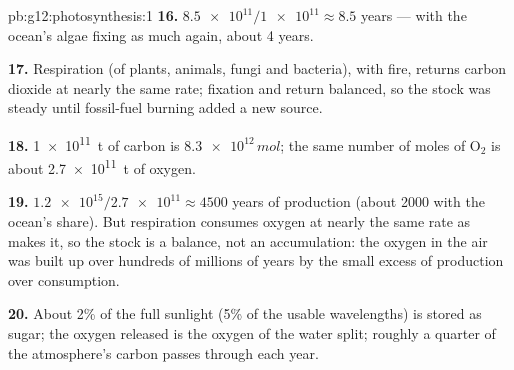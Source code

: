 \begin{solution}{pb:g12:photosynthesis:1}
\textbf{16.} $\num{8.5e11}/\num{1e11} \approx 8.5$ years --- with the
ocean's algae fixing as much again, about 4 years.

\textbf{17.} Respiration (of plants, animals, fungi and bacteria),
with fire, returns carbon dioxide at nearly the same rate; fixation
and return balanced, so the stock was steady until fossil-fuel burning
added a new source.

\textbf{18.} \qty{1e11}{t} of carbon is $\num{8.3e12}\,\unit{mol}$; the
same number of moles of $\mathrm{O_2}$ is about \qty{2.7e11}{t} of
oxygen.

\textbf{19.} $\num{1.2e15}/\num{2.7e11} \approx 4500$ years of
production (about 2000 with the ocean's share). But respiration
consumes oxygen at nearly the same rate as  makes it,
so the stock is a balance, not an accumulation: the oxygen in the air
was built up over hundreds of millions of years by the small excess
of production over consumption.

\textbf{20.} About 2\% of the full sunlight (5\% of the usable
wavelengths) is stored as sugar; the oxygen released is the oxygen of
the water split; roughly a quarter of the atmosphere's carbon passes
through  each year.
\end{solution}
